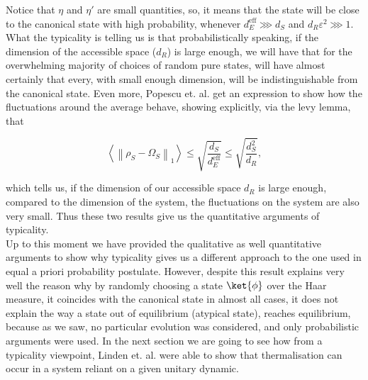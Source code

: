 \indent Notice that $\eta$ and $\eta'$ are small quantities, so, it means that the state will be close to the canonical state with high probability, whenever $d^{\mathrm{eff}}_E\ggg d_S$ and $d_R\varepsilon^2\ggg 1$. What the typicality is telling us is that probabilistically speaking, if the dimension of the accessible space ($d_R$) is large enough, we will have that for the overwhelming majority of choices of random pure states, will have almost certainly that every, with small enough dimension, will be indistinguishable from the canonical state. Even more, Popescu et. al. get an expression to show how the fluctuations around the average behave, showing explicitly, via the levy lemma, that

\begin{equation}
\left\langle\left\|\rho_{S}-\Omega_{S}\right\|_{1}\right\rangle \leq \sqrt{\frac{d_S}{d_E^{\mathrm{eff}}}}\leq\sqrt{\frac{d_{S}^{2}}{d_{R}}},
\label{CH1:Typicality_result_2}
\end{equation}

which tells us, if the dimension of our accessible space $d_R$ is large enough, compared to the dimension of the system, the fluctuations on the system are also very small. Thus these two results give us the quantitative arguments of typicality.\\

\indent Up to this moment we have provided the qualitative as well quantitative arguments to show why typicality gives us a different approach to the one used in equal a priori probability postulate. However, despite this result explains very well the reason why by randomly choosing a state $\ket{\phi}$ over the Haar measure, it coincides with the canonical state in almost all cases, it does not explain the way a state out of equilibrium (atypical state), reaches equilibrium, because as we saw, no particular evolution was considered, and only probabilistic arguments were used. In the next section we are going to see how from a typicality viewpoint,  Linden et. al. were able to show that thermalisation can occur in a system reliant on a given unitary dynamic.

